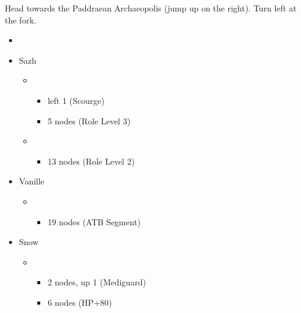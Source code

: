 Head towards the Paddraean Archaeopolis (jump up on the right). Turn left at the fork.

\begin{menu}
	\begin{itemize}
		\paradigm
		\begin{itemize}
			\item {}%
				  {\paradigmline{(\rav)}{(\rav)}{\sen}}%
			      {\paradigmline{(\rav)}{\rav}{(\rav)}}%
			      {\paradigmline{(\rav)}{\sab}{(\rav)}}%
			      {\paradigmline[4]{\syn}{(\med)}{\com}}%
			      {\paradigmline{\com}{(\rav)}{\com}}%
			      {\paradigmline{\com}{\sab}{\sen}}
		\end{itemize}
		\crystarium
		\begin{itemize}
			\item Sazh
				\begin{itemize}
					\item \com
						\begin{itemize}
							\item left 1 (Scourge)
							\item 5 nodes (Role Level 3)
						\end{itemize}
					\item \rav
						\begin{itemize}
							\item 13 nodes (Role Level 2)
						\end{itemize}
				\end{itemize}
			\item Vanille
				\begin{itemize}
					\item \med
						\begin{itemize}
							\item 19 nodes (ATB Segment)
						\end{itemize}
				\end{itemize}
			\item Snow
				\begin{itemize}
					\item \sen
						\begin{itemize}
							\item 2 nodes, up 1 (Mediguard)
							\item 6 nodes (HP+80)
						\end{itemize}
				\end{itemize}
		\end{itemize}
		\equip
		\begin{itemize}

\end{itemize}
\end{itemize}
\end{menu}
